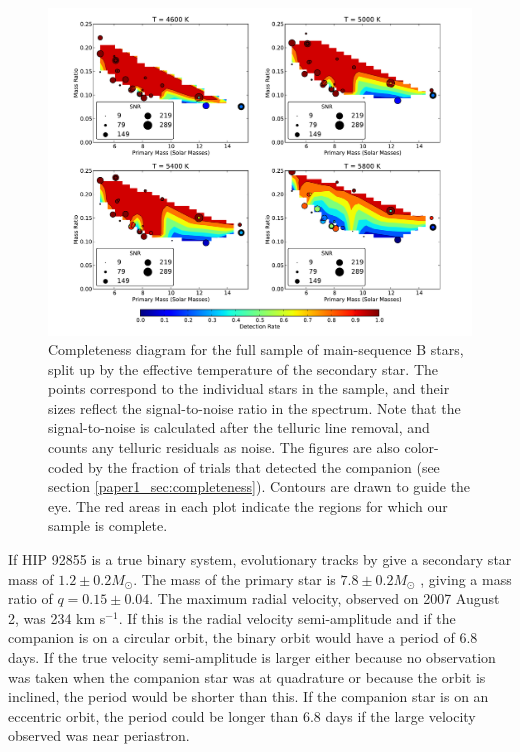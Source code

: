 \begin{figure}[ht]
  \centering
  \includegraphics[width=5.5in]{Figures/paper1_fig6.pdf}
  \caption{Completeness diagram for the full sample of main-sequence B
  stars, split up by the effective temperature of the secondary
  star. The points correspond to the individual stars in the sample,
  and their sizes reflect the signal-to-noise ratio in the
  spectrum. Note that the signal-to-noise is calculated after the
  telluric line removal, and counts any telluric residuals as
  noise. The figures are also color-coded by the fraction of trials
  that detected the companion (see section
  \ref{paper1_sec:completeness}). Contours are drawn to guide the eye. The red 
  areas in each plot indicate the regions for which our sample is complete.}
  \label{paper1_fig:completeness}
\end{figure}

If HIP 92855 is a true binary system, evolutionary tracks by
\cite{Landin2008} give a secondary star mass of $1.2 \pm 0.2 M_{\odot}$. The mass of the
primary star is $7.8 \pm 0.2 M_{\odot}$ \citep{Tetzlaff2010}, giving a mass
ratio of $q = 0.15 \pm 0.04$. The maximum radial velocity, observed on 2007 August 2, was 234 km s$^{-1}$. If this is the radial velocity semi-amplitude and if the companion is on a circular orbit, the binary orbit would have a period of 6.8 days. If the true velocity semi-amplitude is larger either because no observation was taken when the companion star was at quadrature or because the orbit is inclined, the period would be shorter than this. If the companion star is on an eccentric orbit, the period could be longer than 6.8 days if the large velocity observed was near periastron.




